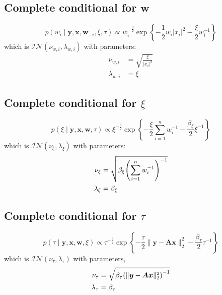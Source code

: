 \documentclass{article}
\numberwithin{equation}{section}
\newcommand{\lh}{\mathopen{}\mathclose\bgroup\left}
\newcommand{\rh}{\aftergroup\egroup\right}
\newcommand{\m}[1]{\boldsymbol{#1}}
\begin{document}
\subsection{Complete conditional for $\m{w}$}
\begin{equation}
p(w_i \mid \m{y}, \m{x}, \m{w}_{-i}, \xi, \tau) \propto
 w_i^{-\frac{3}{2}}
 \exp\left\{
  -\frac{1}{2} w_i |x_i|^2
  -\frac{\xi}{2} w_i^{-1}
 \right\}
\end{equation}
which is $\mathcal{IN}(\nu_{w,i}, \lambda_{w,i})$ with parameters:
\begin{equation}
\begin{aligned}
\nu_{w,i} &= \sqrt{\frac{\xi}{|x_i|^2}}
\\
\lambda_{w,i} &= \xi
\end{aligned}
\end{equation}

\subsection{Complete conditional for $\xi$}
\begin{equation}
p(\xi \mid \m{y}, \m{x}, \m{w}, \tau) \propto
 \xi^{-\frac{3}{2}}
 \exp\left\{
  -\frac{\xi}{2} \sum_{i=1}^n w_i^{-1}
  -\frac{\beta_\xi}{2} \xi^{-1}
 \right\}
\end{equation}
which is $\mathcal{IN}(\nu_\xi, \lambda_\xi)$ with parameters:
\begin{equation}
\begin{aligned}
\nu_\xi &= \sqrt{\beta_\xi \lh( \sum_{i=1}^n w_i^{-1} \rh)^{-1}}
\\
\lambda_\xi &= \beta_\xi
\end{aligned}
\end{equation}

\subsection{Complete conditional for $\tau$}
\begin{equation}
p(\tau \mid \m{y}, \m{x}, \m{w}, \xi) \propto
 \tau^{-\frac{3}{2}}
 \exp\left\{
  -\frac{\tau}{2} \| \m{y} - \m{A} \m{x} \|_2^2
  -\frac{\beta_\tau}{2} \tau^{-1}
 \right\}
\end{equation}
which is $\mathcal{IN}(\nu_\tau, \lambda_\tau)$ with parameters,
\begin{equation}
\begin{aligned}
\nu_\tau &= \sqrt{\beta_\tau \lh( \| \m{y} - \m{A} \m{x} \|_2^2 \rh)^{-1}}
\\
\lambda_\tau &= \beta_\tau
\end{aligned}
\end{equation}
\end{document}
